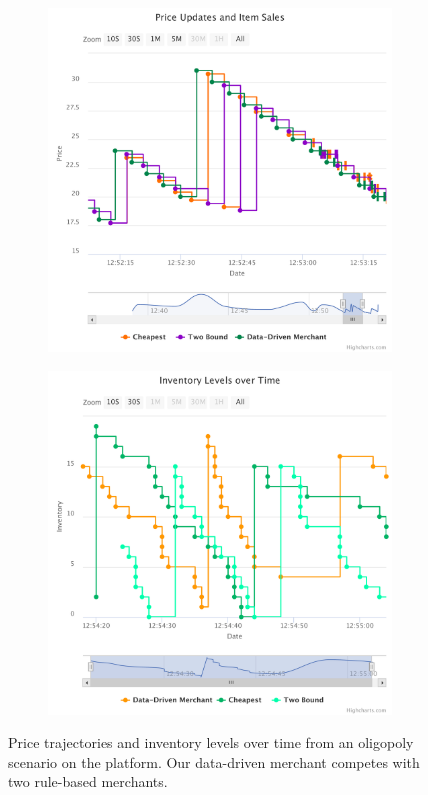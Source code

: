 \begin{figure}[t]
\centering
\begin{subfigure}{0.5\textwidth}
\centering
\includegraphics[width=\textwidth]{figures/competition_prices.pdf}
\end{subfigure}%
\begin{subfigure}{0.5\textwidth}
	\centering
	\includegraphics[width=\textwidth]{figures/competition_inventory.pdf}
\end{subfigure}	
	\caption{Price trajectories and inventory levels over time from an oligopoly scenario on the \pricewars platform. Our data-driven merchant competes with two rule-based merchants.}
	\label{fig:competition}
\end{figure}

